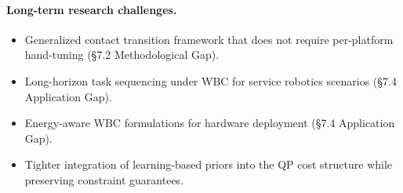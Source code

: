 \paragraph{Long-term research challenges.}
\begin{itemize}
  \item Generalized contact transition framework that does not require per-platform hand-tuning (§7.2 Methodological Gap).
  \item Long-horizon task sequencing under WBC for service robotics scenarios (§7.4 Application Gap).
  \item Energy-aware WBC formulations for hardware deployment (§7.4 Application Gap).
  \item Tighter integration of learning-based priors into the QP cost structure while preserving constraint guarantees.
\end{itemize}

\lipsum[48]
